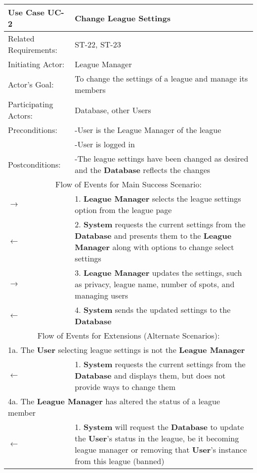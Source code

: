 \begin{centering}
\renewcommand\arraystretch{1.3} %
\begin{longtable}{|p{1.2in} p{5in}|}
\hline
\bfseries{\color{color1}Use Case UC-2} & \bfseries{\color{color1}Change League Settings} \\
\hline
Related Requirements: & ST-22, ST-23\\ 
Initiating Actor:     & League Manager \\
Actor's Goal:         & To change the settings of a league and manage its members \\
Participating Actors:  & Database, other Users \\
Preconditions:        & -User is the League Manager of the league \\
 & -User is logged in \\
Postconditions:       & -The league settings have been changed as desired and the \textbf{Database} reflects the changes \\
\hline
\multicolumn{2}{|c|}{\color{color1}Flow of Events for Main Success Scenario:}\\
\hline
$\rightarrow$ & 1. \textbf{League Manager} selects the league settings option from the league page \\
$\leftarrow$ & 2. \textbf{System} requests the current settings from the \textbf{Database} and presents them to the \textbf{League Manager} along with options to change select settings \\
$\rightarrow$ & 3. \textbf{League Manager} updates the settings, such as privacy, league name, number of spots, and managing users \\
$\leftarrow$ & 4. \textbf{System} sends the updated settings to the \textbf{Database} \\
\hline
\multicolumn{2}{|c|}{\color{color1}Flow of Events for Extensions (Alternate Scenarios):} \\
\hline
\multicolumn{2}{|p{6.2in}|}{1a. The \textbf{User} selecting league settings is not the \textbf{League Manager}} \\
\hline
$\leftarrow$ & 1. \textbf{System} requests the current settings from the \textbf{Database} and displays them, but does not provide ways to change them \\
\hline
\multicolumn{2}{|p{6.2in}|}{4a. The \textbf{League Manager} has altered the status of a league member} \\
\hline
$\leftarrow$ & 1. \textbf{System} will request the \textbf{Database} to update the \textbf{User}'s status in the league, be it becoming league manager or removing that \textbf{User}'s instance from this league (banned)\\
\hline
\end{longtable}
\end{centering}

